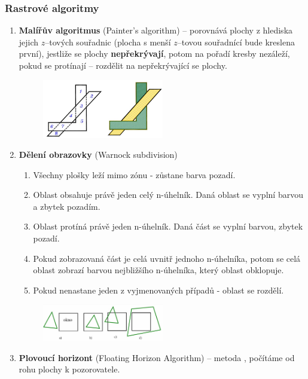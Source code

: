 \subsubsection{Rastrové algoritmy}
\begin{enumerate}
	\item \textbf{Malířův algoritmus} (Painter's algorithm) -- porovnává plochy z hlediska jejich $z$--tových souřadnic (plocha s menší $z$--tovou souřadnící bude kreslena první), jestliže se plochy \textbf{nepřekrývají}, potom na pořadí kresby nezáleží, pokud se protínají -- rozdělit na nepřekrývající se plochy.
		\begin{figure}[H]
		\centering
		\includegraphics[width=0.5\textwidth]{assets/5_malir}
		\end{figure}
	\item \textbf{Dělení obrazovky }(Warnock subdivision)
		\begin{enumerate}
				\item Všechny plošky leží mimo zónu - zůstane barva pozadí.
				\item Oblast obsahuje právě jeden celý n-úhelník. Daná oblast se vyplní barvou a zbytek pozadím. 
				\item Oblast protíná právě jeden n-úhelník. Daná část se vyplní barvou, zbytek pozadí. 
				\item Pokud zobrazovaná část je celá uvnitř jednoho n-úhelníka, potom se celá oblast zobrazí barvou nejbližšího n-úhelníka, který oblast obklopuje. 
				\item Pokud nenastane jeden z vyjmenovaných případů - oblast se rozdělí.
		\end{enumerate}
		\begin{figure}[H]
		\centering
		\includegraphics[width=0.5\textwidth]{assets/5_warnock}
		\end{figure}
	\item \textbf{Plovoucí horizont} (Floating Horizon Algorithm) -- metoda , počítáme od  rohu plochy k  pozorovatele.

\end{enumerate}
